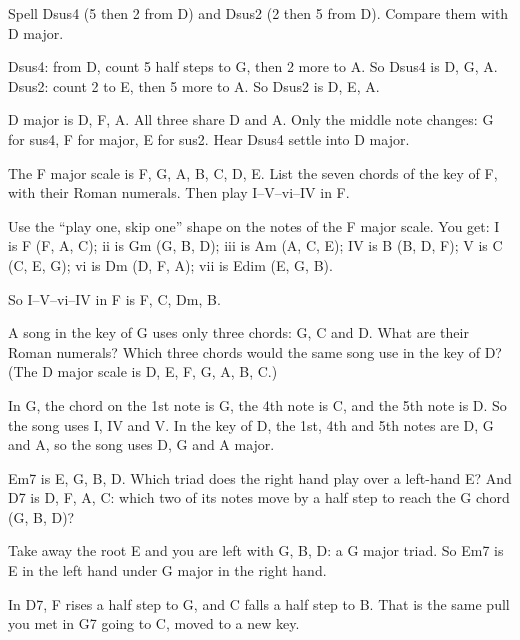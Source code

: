 \begin{exercise}
Spell Dsus4 (5 then 2 from D) and Dsus2 (2 then 5 from D). Compare them with D major.
\end{exercise}

\begin{answerbox}
Dsus4: from D, count 5 half steps to G, then 2 more to A. So Dsus4 is D, G, A.  Dsus2: count 2 to E, then 5 more to A. So Dsus2 is D, E, A. 

D major is D, F\sh, A. All three share D and A. Only the middle note changes: G for sus4, F\sh{} for major, E for sus2. Hear Dsus4 settle into D major. 
\end{answerbox}

\begin{exercise}
The F major scale is F, G, A, B\fl, C, D, E. List the seven chords of the key of F, with their Roman numerals. Then play I--V--vi--IV in F.
\end{exercise}

\begin{answerbox}
Use the ``play one, skip one'' shape on the notes of the F major scale. You get: I is F (F, A, C); ii is Gm (G, B\fl, D); iii is Am (A, C, E); IV is B\fl{} (B\fl, D, F); V is C (C, E, G); vi is Dm (D, F, A); vii\textdegree{} is Edim (E, G, B\fl).

So I--V--vi--IV in F is F, C, Dm, B\fl{}. 
\end{answerbox}

\begin{exercise}
A song in the key of G uses only three chords: G, C and D. What are their Roman numerals? Which three chords would the same song use in the key of D? (The D major scale is D, E, F\sh, G, A, B, C\sh.)
\end{exercise}

\begin{answerbox}
In G, the chord on the 1st note is G, the 4th note is C, and the 5th note is D. So the song uses I, IV and V. In the key of D, the 1st, 4th and 5th notes are D, G and A, so the song uses D, G and A major. 
\end{answerbox}

\begin{exercise}
Em7 is E, G, B, D. Which triad does the right hand play over a left-hand E? And D7 is D, F\sh, A, C: which two of its notes move by a half step to reach the G chord (G, B, D)?
\end{exercise}

\begin{answerbox}
Take away the root E and you are left with G, B, D: a G major triad. So Em7 is E in the left hand under G major in the right hand. 

In D7, F\sh{} rises a half step to G, and C falls a half step to B. That is the same pull you met in G7 going to C, moved to a new key. 
\end{answerbox}

